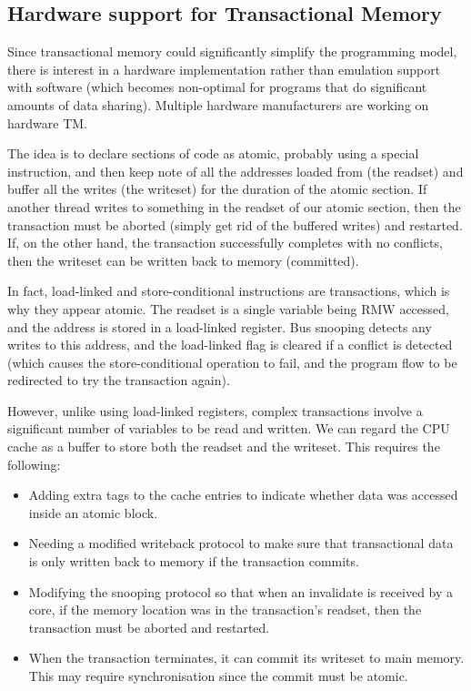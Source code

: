 
\subsection{Hardware support for Transactional Memory}

Since transactional memory could significantly simplify the
programming model, there is interest in a hardware implementation
rather than emulation support with software (which becomes non-optimal
for programs that do significant amounts of data sharing). Multiple
hardware manufacturers are working on hardware TM.

The idea is to declare sections of code as atomic, probably using a
special instruction, and then keep note of all the addresses loaded
from (the readset) and buffer all the writes (the writeset) for the
duration of the atomic section. If another thread writes to something
in the readset of our atomic section, then the transaction must be
aborted (simply get rid of the buffered writes) and restarted. If, on
the other hand, the transaction successfully completes with no
conflicts, then the writeset can be written back to memory
(committed).

In fact, load-linked and store-conditional instructions are
transactions, which is why they appear atomic. The readset is a single
variable being RMW accessed, and the address is stored in a
load-linked register. Bus snooping detects any writes to this address,
and the load-linked flag is cleared if a conflict is detected (which
causes the store-conditional operation to fail, and the program flow
to be redirected to try the transaction again).

However, unlike using load-linked registers, complex transactions
involve a significant number of variables to be read and written. We
can regard the CPU cache as a buffer to store both the readset and the
writeset. This requires the following:

\begin{itemize}
\item Adding extra tags to the cache entries to
indicate whether data was accessed inside an atomic block.
\item Needing a modified writeback protocol to make sure that transactional
data is only written back to memory if the transaction commits.
\item Modifying the snooping protocol so that when an invalidate is
received by a core, if the memory location was in the transaction's
readset, then the transaction must be aborted and restarted.
\item When the transaction terminates, it can commit its writeset to
main memory. This may require synchronisation since the commit must be
atomic.
\end{itemize}

